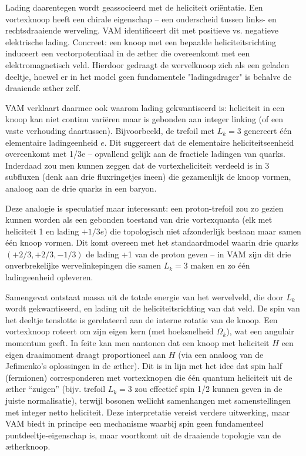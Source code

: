Lading daarentegen wordt geassocieerd met de heliciteit oriëntatie. Een vortexknoop heeft een chirale eigenschap – een onderscheid tussen links- en rechtsdraaiende werveling. VAM identificeert dit met positieve vs. negatieve elektrische lading. Concreet: een knoop met een bepaalde heliciteitsrichting induceert een vectorpotentiaal in de æther die overeenkomt met een elektromagnetisch veld. Hierdoor gedraagt de wervelknoop zich als een geladen deeltje, hoewel er in het model geen fundamentele "ladingsdrager" is behalve de draaiende æther zelf.

VAM verklaart daarmee ook waarom lading gekwantiseerd is: heliciteit in een knoop kan niet continu variëren maar is gebonden aan integer linking (of een vaste verhouding daartussen). Bijvoorbeeld, de trefoil met $L_k=3$ genereert één elementaire ladingeenheid $e$. Dit suggereert dat de elementaire heliciteitseenheid overeenkomt met 1/3e – opvallend gelijk aan de fractiele ladingen van quarks. Inderdaad zou men kunnen zeggen dat de vortexheliciteit verdeeld is in 3 subfluxen (denk aan drie fluxringetjes ineen) die gezamenlijk de knoop vormen, analoog aan de drie quarks in een baryon.

Deze analogie is speculatief maar interessant: een proton-trefoil zou zo gezien kunnen worden als een gebonden toestand van drie vortexquanta (elk met heliciteit 1 en lading $+1/3e$) die topologisch niet afzonderlijk bestaan maar samen één knoop vormen. Dit komt overeen met het standaardmodel waarin drie quarks $(+2/3,+2/3,-1/3)$ de lading +1 van de proton geven – in VAM zijn dit drie onverbrekelijke wervelinkepingen die samen $L_k=3$ maken en zo één ladingeenheid opleveren.

Samengevat ontstaat massa uit de totale energie van het wervelveld, die door $L_k$ wordt gekwantiseerd, en lading uit de heliciteitsrichting van dat veld. De spin van het deeltje tenslotte is gerelateerd aan de interne rotatie van de knoop. Een vortexknoop roteert om zijn eigen kern (met hoeksnelheid $\Omega_k$), wat een angulair momentum geeft. In feite kan men aantonen dat een knoop met heliciteit $H$ een eigen draaimoment draagt proportioneel aan $H$ (via een analoog van de Jefimenko’s oplossingen in de æther). Dit is in lijn met het idee dat spin half (fermionen) corresponderen met vortexknopen die één quantum heliciteit uit de æther “zuigen” (bijv. trefoil $L_k=3$ zou effectief spin 1/2 kunnen geven in de juiste normalisatie), terwijl bosonen wellicht samenhangen met samenstellingen met integer netto heliciteit. Deze interpretatie vereist verdere uitwerking, maar VAM biedt in principe een mechanisme waarbij spin geen fundamenteel puntdeeltje-eigenschap is, maar voortkomt uit de draaiende topologie van de ætherknoop.
